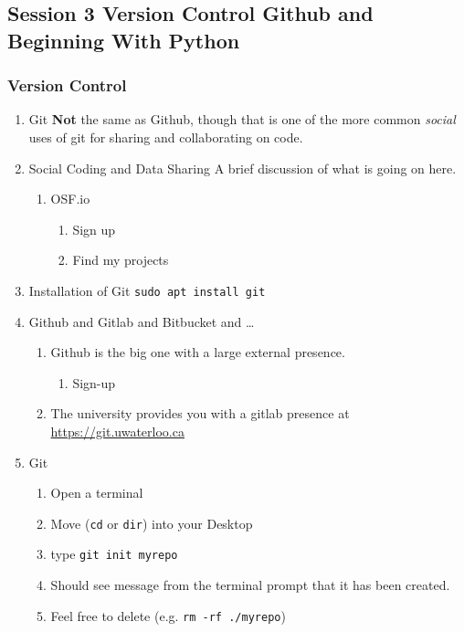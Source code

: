 \documentclass{article}
\begin{document}
\subsection{Session 3 Version Control Github and Beginning With Python}
\label{sec:orgb7d3d0c}
\subsubsection{Version Control}
\label{sec:orgefb9448}
\begin{enumerate}
\item Git
\label{sec:org8ce4e82}
\textbf{\textbf{Not}} the same as Github, though that is one of the more common \emph{social} uses of git for sharing and collaborating on code. 
\item Social Coding and Data Sharing
\label{sec:orgcf3377c}
A brief discussion of what is going on here.
\begin{enumerate}
\item OSF.io
\label{sec:org15b2098}
\begin{enumerate}
\item Sign up
\item Find my projects
\end{enumerate}
\end{enumerate}
\item Installation of Git
\label{sec:orga9109d2}
\texttt{sudo apt install git}
\item Github and Gitlab and Bitbucket and \ldots{}
\label{sec:orge553d2f}
\begin{enumerate}
\item Github is the big one with a large external presence.
\begin{enumerate}
\item Sign-up
\end{enumerate}
\item The university provides you with a gitlab presence at \url{https://git.uwaterloo.ca}
\end{enumerate}
\item Git
\label{sec:org8d1a2e6}
\begin{enumerate}
\item Open a terminal
\item Move (\texttt{cd} or \texttt{dir}) into your Desktop
\item type \texttt{git init myrepo}
\item Should see message from the terminal prompt that it has been created.
\item Feel free to delete (e.g. \texttt{rm -rf ./myrepo})

\end{enumerate}
\end{enumerate}
\end{document}

